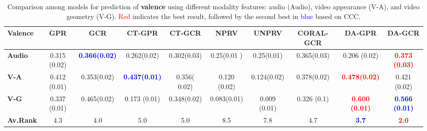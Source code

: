 \documentclass{article}
\newcommand{\todo}[1]{\textcolor{red}{#1}}
\begin{document}
\begin{table*}[tbh]
	\begin{center}
    \caption{Comparison among models for prediction of \textbf{valence} using different modality features:  audio (Audio), video appearance (V-A), and video geometry (V-G).  \textcolor{red}{Red} indicates the best result, followed by the second best in \textcolor{blue}{blue} based on CCC.}
			\label{tb:avec_valence}
			{\footnotesize
				\hfill{}
				\begin{tabular}{lccccccccc} 
					\toprule
					\textbf{Valence} & GPR & GCR & CT-GPR & CT-GCR  & NPRV & UNPRV & CORAL-GCR  & DA-GPR  & DA-GCR \\
					\midrule
					\textbf{Audio} & 0.315 (0.02) & \textcolor{blue}{\textbf{0.366(0.02)}} &  0.262(0.02)  & 0.302(0.03) & 0.25(0.01 ) & 0.25(0.01) & 0.365(0.03) &0.206 (0.02)  & \textcolor{red}{\textbf{0.373 (0.03)}}  \\ 
        \textbf{V-A} & 0.412 (0.01) & 0.353(0.02)   & \textcolor{blue}{ \textbf{0.437(0.01)} } & 0.356( 0.02) & 0.120 (0.02) &0.124(0.02) & 0.378(0.02) &  \textcolor{red}{\textbf{0.478(0.02)}} &0.421 (0.02)\\             
\textbf{V-G} & 0.337 (0.01)& 0.465(0.02) & 0.173 (0.01) & 0.348(0.02) & 0.083(0.01) & 0.009 (0.01) & 0.326 (0.1) &  \textcolor{red}{\textbf{0.600 (0.01) }}& \textcolor{blue}{\textbf{0.566 (0.01)}}  \\	
   \midrule
 \textbf{Av.Rank} & 4.3 & 4.0  & 5.0  & 5.0 & 8.5  & 7.8 & 4.7 & \textcolor{blue}{ \textbf{3.7}}  & \textcolor{red}{\textbf{2.0}}     \\ 
 

\bottomrule
			\end{tabular}}
			\hfill{}
	\end{center}
\end{table*}


	
	


\end{document}
